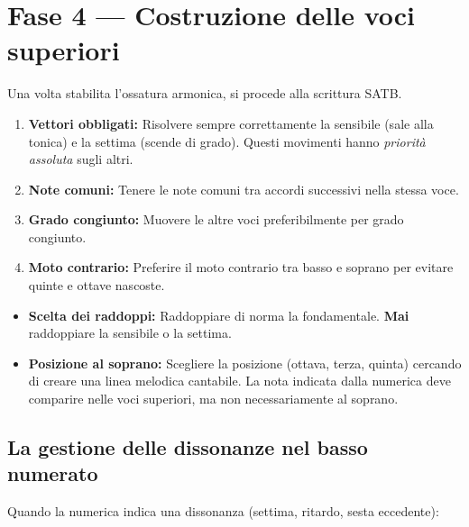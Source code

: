 \section{Fase 4 — Costruzione delle voci superiori}
\label{sec:fase4_numerato}

Una volta stabilita l'ossatura armonica, si procede alla scrittura SATB.

\begin{regola}
	\label{reg:priorita_scrittura_numerato}
	\begin{enumerate}
		\item \textbf{Vettori obbligati:} Risolvere sempre correttamente la sensibile (sale alla tonica) e la settima (scende di grado). Questi movimenti hanno \textit{priorità assoluta} sugli altri.
		\item \textbf{Note comuni:} Tenere le note comuni tra accordi successivi nella stessa voce.
		\item \textbf{Grado congiunto:} Muovere le altre voci preferibilmente per grado congiunto.
		\item \textbf{Moto contrario:} Preferire il moto contrario tra basso e soprano per evitare quinte e ottave nascoste.
	\end{enumerate}
\end{regola}

\begin{itemize}
	\item \textbf{Scelta dei raddoppi:} Raddoppiare di norma la fondamentale. \textbf{Mai} raddoppiare la sensibile o la settima.
	\item \textbf{Posizione al soprano:} Scegliere la posizione (ottava, terza, quinta) cercando di creare una linea melodica cantabile. La nota indicata dalla numerica deve comparire nelle voci superiori, ma non necessariamente al soprano.
\end{itemize}

\subsection{La gestione delle dissonanze nel basso numerato}

Quando la numerica indica una dissonanza (settima, ritardo, sesta eccedente):

